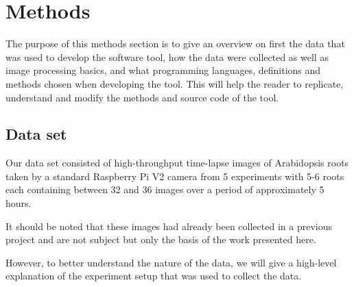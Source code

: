
\chapter{Methods} %

\label{methods} %

%


The purpose of this methods section is to give an overview on first the data that was used to develop the software tool, how the data were collected as well as image processing basics, and what programming languages, definitions and methods chosen when developing the tool. This will help the reader to replicate, understand and modify the methods and source code of the tool. 

\section{Data set}

Our data set consisted of high-throughput time-lapse images of Arabidopsis roots taken by a standard Raspberry Pi V2 camera from 5 experiments with 5-6 roots each containing between 32 and 36 images over a period of approximately 5 hours. 

It should be noted that these images had already been collected in a previous project and are not subject but only the basis of the work presented here. 

However, to better understand the nature of the data, we will give a high-level explanation of the experiment setup that was used to collect the data.


